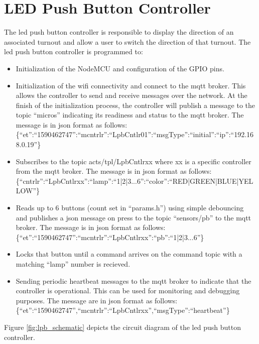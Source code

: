 \section{LED Push Button Controller}
\label{sec:lcb-controller}
The \gls{led} push button controller is responsible to display the direction of an associated turnout and allow a user to switch the direction of that turnout. The \gls{led} push button controller is programmed to:
\begin{itemize}
    \item Initialization of the NodeMCU and configuration of the GPIO pins.
    \item Initialization of the \gls{wifi} connectivity and connect to the \gls{mqtt} broker. This allows the controller to send and receive messages over the network. At the finish of the initialization process, the controller will publish a message to the topic ``micros''  indicating its readiness and status to the \gls{mqtt} broker. The message is in \gls{json} format as follows:\\
\{``et'':``1590462747'':``mcntrlr'':``LpbCntlr01'':``msgType'':``initial'':``ip'':``192.168.0.19''\}
    \item Subscribes to the topic acts/tpl/LpbCntlrxx where xx is a specific controller from the \gls{mqtt} broker. The message is in \gls{json} format as follows:\\
\{``cntrlr'':``LpbCntlrxx'':``lamp'':``1|2|3...6'':``color'':``RED|GREEN|BLUE|YELLOW''\}
    \item Reads up to 6 buttons (count set in ``params.h'') using simple debouncing and publishes a \gls{json} message on press to the topic ``sensors/pb'' to the \gls{mqtt} broker. The message is in \gls{json} format as follows:\\
    \{``et'':``1590462747'':``mcntrlr'':``LpbCntlrxx'':``pb'':``1|2|3...6''\}
    \item Locks that button until a command arrives on the command topic with a matching ``lamp'' number is recieved.
    \item Sending periodic heartbeat messages to the \gls{mqtt} broker to indicate that the controller is operational. This can be used for monitoring and debugging purposes. The message are in \gls{json} format as follows:\\
\{``et'':``1590462747'',``mcntrlr'':``LpbCntlrxx'',``msgType'':``heartbeat''\}
\end{itemize}

Figure \ref{fig:lpb_schematic} depicts the circuit diagram of the \gls{led} push button controller.

